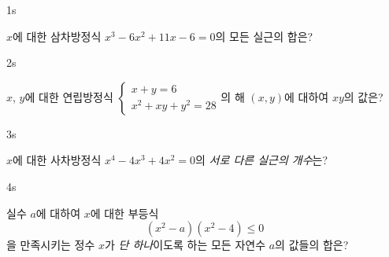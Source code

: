 \documentclass[10pt]{article}
\begin{document}


\begin{pagepair}

\begin{problem}{1}{s}
\par\smallskip
$x$에 대한 삼차방정식 $x^3 - 6x^2 + 11x - 6 = 0$의 모든 실근의 합은?
\begin{choices}
\end{choices}
\end{problem}

\begin{problem}{2}{s}
\par\smallskip
$x$, $y$에 대한 연립방정식 $\begin{cases} x + y = 6 \\ x^2 + xy + y^2 = 28 \end{cases}$의 해 $(x, y)$에 대하여 $xy$의 값은?
\begin{choices}
\end{choices}
\end{problem}

\end{pagepair}

\begin{pagepair}

\begin{problem}{3}{s}
\par\smallskip
$x$에 대한 사차방정식 $x^4 - 4x^3 + 4x^2 = 0$의 \emph{서로 다른 실근의 개수}는?
\begin{choices}
\end{choices}
\end{problem}

\begin{problem}{4}{s}
\par\smallskip
실수 $a$에 대하여 $x$에 대한 부등식
$$(x^2 - a)(x^2 - 4) \le 0$$
을 만족시키는 정수 $x$가 \emph{단 하나}이도록 하는 모든 자연수 $a$의 값들의 합은?
\begin{choices}
\end{choices}
\end{problem}

\end{pagepair}
\end{document}
